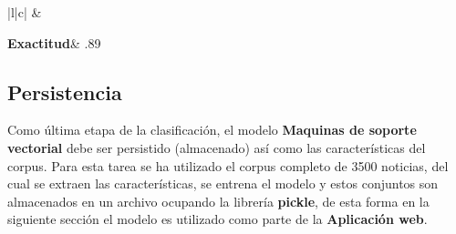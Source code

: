 \begin{table}[H]
\centering
	\begin{tabular}{|l|c|}
		\hline
{}&
\\  

\textbf{Exactitud}& .89\\
\hline
	\end{tabular}
\caption{Acurracy de la prueba}
\label{tab:cp5:exactitud}
\end{table}

\subsection{Persistencia}


Como última etapa de la clasificación, el modelo \textbf{Maquinas de soporte vectorial} debe ser persistido (almacenado) así como las características del corpus. Para esta tarea se ha utilizado el corpus completo de 3500 noticias, del cual se extraen las características, se entrena el modelo y estos conjuntos son almacenados en un archivo ocupando la librería \textbf{pickle}, de esta forma en la siguiente sección el modelo es utilizado como parte de la \textbf{Aplicación web}.



